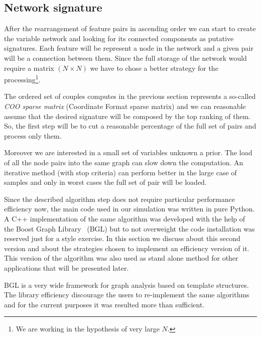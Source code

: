 \documentclass{standalone}
\begin{document}
\subsection[Network Signature]{Network signature}\label{implementation:network}

After the rearrangement of feature pairs in ascending order we can start to create the variable network and looking for its connected components as putative signatures.
Each feature will be represent a node in the network and a given pair will be a connection between them.
Since the full storage of the network would require a matrix $(N\times N)$ we have to chose a better strategy for the processing\footnote{
  We are working in the hypothesis of very large $N$.
}.

The ordered set of couples computes in the previous section represents a so-called \emph{COO sparse matrix} (Coordinate Format sparse matrix) and we can reasonable assume that the desired signature will be composed by the top ranking of them.
So, the first step will be to cut a reasonable percentage of the full set of pairs and process only them.

Moreover we are interested in a small set of variables unknown a prior.
The load of all the node pairs into the same graph can slow down the computation.
An iterative method (with stop criteria) can perform better in the large case of samples and only in worst cases the full set of pair will be loaded.

Since the described algorithm step does not require particular performance efficiency now, the main code used in our simulation was written in pure \textsf{Python}.
A \textsf{C++} implementation of the same algorithm was developed with the help of the Boost Graph Library~\cite{BGL} (BGL) but to not overweight the code installation was reserved just for a style exercise.
In this section we discuss about this second version and about the strategies chosen to implement an efficiency version of it.
This version of the algorithm was also used as stand alone method for other applications that will be presented later.

BGL is a very wide framework for graph analysis based on template structures.
The library efficiency discourage the users to re-implement the same algorithms and for the current purposes it was resulted more than sufficient.
\end{document}
